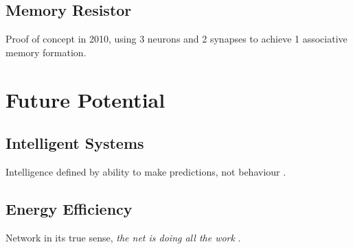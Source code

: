 \documentclass[12pt, a4paper]{article}
\begin{document}


\subsection{Memory Resistor}


Proof of concept in 2010, using 3 neurons and 2 synapses to achieve 1 associative memory formation.


\section{Future Potential}

\subsection{Intelligent Systems}

Intelligence defined by ability to make predictions, not behaviour \cite{intelligence_is_prediction}.

\subsection{Energy Efficiency}

Network in its true sense, \textit{the net is doing all the work} \cite{net_doing_all_the_work}.

\cite{ahah}



\end{document}
